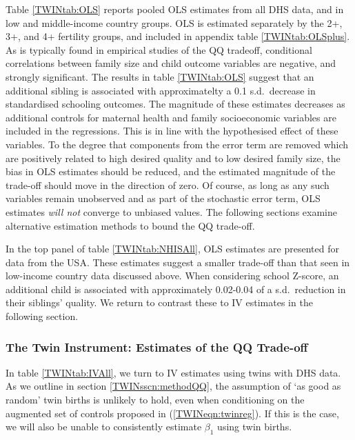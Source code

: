Table \ref{TWINtab:OLS} reports pooled OLS estimates from all DHS data, and in 
low and middle-income country groups. OLS is estimated separately by the 2+, 3+,
and 4+ fertility groups, and included in appendix table \ref{TWINtab:OLSplus}.
As is typically found in empirical studies of the QQ tradeoff, conditional 
correlations between family size and child outcome variables are negative, and 
strongly significant.  The results in table \ref{TWINtab:OLS} suggest that an 
additional sibling is associated with approximatelty a 0.1 s.d.\ decrease in 
standardised schooling outcomes.  The magnitude of these estimates decreases
as additional controls for maternal health and family socioeconomic variables
are included in the regressions. This is in line with the hypothesised effect
of these variables.  To the degree that components from the error term are 
removed which are positively related to high desired quality and to low desired 
family size, the bias in OLS estimates should be reduced, and the estimated 
magnitude of the trade-off should move in the direction of zero. Of course, as 
long as any such variables remain unobserved and as part of the stochastic error 
term, OLS estimates \emph{will not} converge to unbiased values.  The following 
sections examine alternative estimation methods to bound the QQ trade-off.

In the top panel of table \ref{TWINtab:NHISAll}, OLS estimates are presented
for data from the USA.  These estimates suggest a smaller trade-off than that
seen in low-income country data discussed above.  When considering school 
Z-score, an additional child is associated with approximately 0.02-0.04 of a
s.d.\ reduction in their siblings' quality.  We return to contrast these to IV
estimates in the following section.

\subsubsection{The Twin Instrument: Estimates of the QQ Trade-off}
In table \ref{TWINtab:IVAll}, we turn to IV estimates using twins with DHS data.  
As we outline in section \ref{TWINsscn:methodQQ}, the assumption of `as good as 
random' twin births is unlikely to hold, even when conditioning on the augmented
set of controls proposed in (\ref{TWINeqn:twinreg}). If this is the case, we 
will also be unable to consistently estimate $\beta_1$ using twin births.

